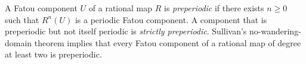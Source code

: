
A Fatou component $U$ of a rational map $R$ is \emph{preperiodic} if there exists $n\ge0$ such that $R^n(U)$ is a periodic Fatou component. A component that is preperiodic but not itself periodic is \emph{strictly preperiodic}. Sullivan's no-wandering-domain theorem implies that every Fatou component of a rational map of degree at least two is preperiodic.
